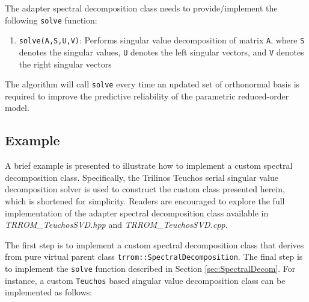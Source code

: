     The adapter spectral decomposition class needs to provide/implement the following \texttt{solve} function:
    \begin{enumerate}
    \item \texttt{solve(A,S,U,V)}: Performs singular value decomposition of matrix \texttt{A}, where \texttt{S} denotes the singular values, \texttt{U} denotes the left singular vectors, and \texttt{V} denotes the right singular vectors
    \end{enumerate}
    The algorithm will call \texttt{solve} every time an updated set of orthonormal basis is required to improve the predictive reliability of the parametric reduced-order model.
    
    \subsection{Example}\label{subsec:SpectralDecomEx}
    
    A brief example is presented to illustrate how to implement a custom spectral decomposition class. Specifically, the Trilinos Teuchos serial singular value decomposition solver is used to construct the custom class presented herein, which is shortened for simplicity. Readers are encouraged to explore the full implementation of the adapter spectral decomposition class available in \emph{TRROM\_TeuchosSVD.hpp} and \emph{TRROM\_TeuchosSVD.cpp}. 
    
    The first step is to implement a custom spectral decomposition class that derives from pure virtual parent class \texttt{trrom::SpectralDecomposition}. The final step is to implement the \texttt{solve} function described in Section \ref{sec:SpectralDecom}. For instance, a custom \texttt{Teuchos} based singular value decomposition class can be implemented as follows:
    
